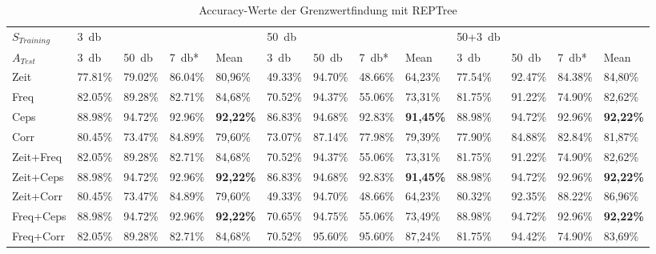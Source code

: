 
\begin{appendices}
\begin{landscape}
\begin{table}[h]
\centering
\caption{Accuracy-Werte der Grenzwertfindung mit REPTree}
\label{tab:reptree_results}
\begin{tabular}{@{}lllllllllllll@{}}
\toprule
$S_{Training}$ & \SI{3}{\decibel}     &         &         &                  & \SI{50}{\decibel}    &         &         &                  & 50+\SI{3}{\decibel} &        &         &                  \\ 
$A_{Test}$     & \SI{3}{\decibel}     & \SI{50}{\decibel}    & \SI{7}{\decibel}*    & Mean             & \SI{3}{\decibel}     & \SI{50}{\decibel}    & \SI{7}{\decibel}*    & Mean             & \SI{3}{\decibel}     & \SI{50}{\decibel}    & \SI{7}{\decibel}*    & Mean             \\ \midrule
Zeit           & 77.81\% & 79.02\% & 86.04\% & 80,96\%          & 49.33\% & 94.70\% & 48.66\% & 64,23\%          & 77.54\% & 92.47\% & 84.38\% & 84,80\%          \\
Freq           & 82.05\% & 89.28\% & 82.71\% & 84,68\%          & 70.52\% & 94.37\% & 55.06\% & 73,31\%          & 81.75\% & 91.22\% & 74.90\% & 82,62\%          \\
Ceps           & 88.98\% & 94.72\% & 92.96\% & \textbf{92,22\%} & 86.83\% & 94.68\% & 92.83\% & \textbf{91,45\%} & 88.98\% & 94.72\% & 92.96\% & \textbf{92,22\%} \\
Corr           & 80.45\% & 73.47\% & 84.89\% & 79,60\%          & 73.07\% & 87.14\% & 77.98\% & 79,39\%          & 77.90\% & 84.88\% & 82.84\% & 81,87\%          \\
Zeit+Freq      & 82.05\% & 89.28\% & 82.71\% & 84,68\%          & 70.52\% & 94.37\% & 55.06\% & 73,31\%          & 81.75\% & 91.22\% & 74.90\% & 82,62\%          \\
Zeit+Ceps      & 88.98\% & 94.72\% & 92.96\% & \textbf{92,22\%} & 86.83\% & 94.68\% & 92.83\% & \textbf{91,45\%} & 88.98\% & 94.72\% & 92.96\% & \textbf{92,22\%} \\
Zeit+Corr      & 80.45\% & 73.47\% & 84.89\% & 79,60\%          & 49.33\% & 94.70\% & 48.66\% & 64,23\%          & 80.32\% & 92.35\% & 88.22\% & 86,96\%          \\
Freq+Ceps      & 88.98\% & 94.72\% & 92.96\% & \textbf{92,22\%} & 70.65\% & 94.75\% & 55.06\% & 73,49\%          & 88.98\% & 94.72\% & 92.96\% & \textbf{92,22\%} \\
Freq+Corr      & 82.05\% & 89.28\% & 82.71\% & 84,68\%          & 70.52\% & 95.60\% & 95.60\% & 87,24\%          & 81.75\% & 94.42\% & 74.90\% & 83,69\%          \\ \bottomrule
\end{tabular}
\end{table}


\end{landscape}
\end{appendices}
